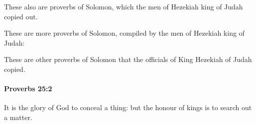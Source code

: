 			\begin{versebox}
					\item[BHS] 
					\item[ASV] These also are proverbs of Solomon, which the men of Hezekiah king of Judah copied out.
					\item[NIV] These are more proverbs of Solomon, compiled by the men of Hezekiah king of Judah:
					\item[NRSV] These are other proverbs of Solomon that the officials of King Hezekiah of Judah copied.
			\end{versebox}

		\paragraph{Proverbs 25:2} %
			\label{PROVERBS-25-2}

			It is the glory of God to conceal a thing: but the honour of kings is to search out a matter.

